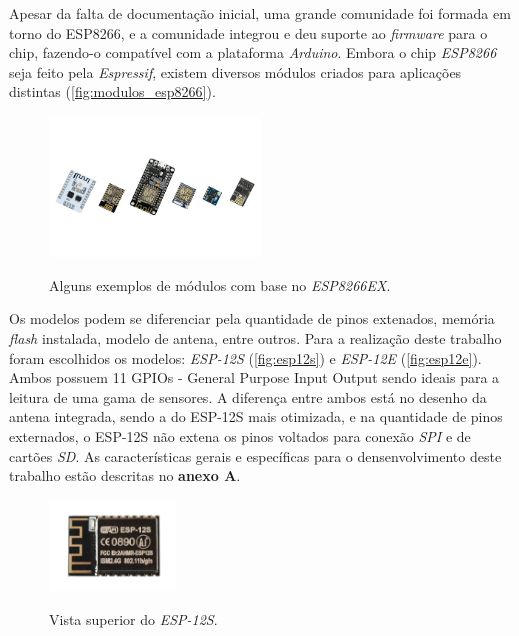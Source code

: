 Apesar da falta de documentação inicial, uma grande comunidade foi formada em
torno do ESP8266, e a comunidade integrou e deu suporte ao \textit{firmware} para o chip, fazendo-o compatível com a plataforma \textit{Arduino}.
Embora o chip \textit{ESP8266} seja feito pela \textit{Espressif}, existem diversos módulos criados para aplicações distintas (\autoref{fig:modulos_esp8266}).

\begin{figure}[H]
	\centering
	\caption{Alguns exemplos de módulos com base no \textit{ESP8266EX}.}
	\includegraphics[width=0.5\textwidth]{figuras/modulos_esp8266.png}
	\label{fig:modulos_esp8266}
\end{figure} 

Os modelos podem se diferenciar pela quantidade de pinos extenados, memória \textit{flash} instalada, modelo de antena, entre outros. Para a realização deste trabalho foram escolhidos os modelos: \textit{ESP-12S} (\autoref{fig:esp12s}) e \textit{ESP-12E} (\autoref{fig:esp12e}). Ambos possuem 11 {GPIOs - General Purpose Input Output} sendo ideais para a leitura de uma gama de sensores. A diferença entre ambos está no desenho da antena integrada, sendo a do ESP-12S mais otimizada, e na quantidade de pinos externados, o ESP-12S não extena os pinos voltados para conexão \textit{SPI} e de cartões \textit{SD}. As características gerais e específicas para o densenvolvimento deste trabalho estão descritas no \textbf{anexo A}. 


\begin{figure}[H]
	\centering
	\caption{Vista superior do \textit{ESP-12S}.}
	\includegraphics[width=0.3\textwidth]{figuras/ESP-12S.png}
	\label{fig:esp12s}
\end{figure} 

